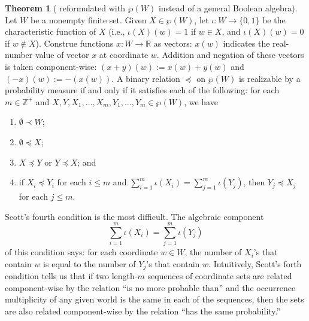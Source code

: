 \documentclass[12pt]{article}
\theoremstyle{definition}
\newtheorem{theorem}{Theorem}[section]
\begin{document}
\begin{theorem}[{\cite[Theorem 4.1]{Sco64:JMP}} reformulated with
  $\wp(W)$ instead of a general Boolean algebra]
  Let $W$ be a nonempty finite set. Given $X\in\wp(W)$, let
  $\iota:W\to\{0,1\}$ be the characteristic function of $X$ (i.e.,
  $\iota(X)(w)=1$ if $w\in X$, and $\iota(X)(w)=0$ if $w\notin X$).
  Construe functions $x:W\to\mathbb{R}$ as vectors: $x(w)$ indicates
  the real-number value of vector $x$ at coordinate $w$. Addition and
  negation of these vectors is taken component-wise:
  $(x+y)(w):=x(w)+y(w)$ and $(-x)(w):=-(x(w))$.  A binary relation
  $\preceq$ on $\wp(W)$ is realizable by a probability measure if and
  only if it satisfies each of the following: for each
  $m\in\mathbb{Z}^+$ and $X,Y,X_1,\dots,X_m,Y_1,\dots,Y_m\in\wp(W)$,
  we have
  \begin{enumerate}
  \item $\emptyset\prec W$;

  \item $\emptyset\preceq X$;

  \item $X\preceq Y$ or $Y\preceq X$; and

  \item if $X_i\preceq Y_i$ for each $i\leq m$ and
    $\sum_{i=1}^m \iota(X_i)=\sum_{j=1}^m\iota(Y_j)$, then
    $Y_j\preceq X_j$ for each $j\leq m$.
  \end{enumerate}
\end{theorem}

Scott's fourth condition is the most difficult. The algebraic
component
\begin{equation}
  \textstyle
  \sum_{i=1}^m \iota(X_i)=\sum_{j=1}^m\iota(Y_j)
  \label{eq:Scott4th}
\end{equation}
of this condition says: for each coordinate $w\in W$, the number of
$X_i$'s that contain $w$ is equal to the number of $Y_j$'s that
contain $w$.  Intuitively, Scott's forth condition tells us that if
two length-$m$ sequences of coordinate sets are related component-wise
by the relation ``is no more probable than'' and the occurrence
multiplicity of any given world is the same in each of the sequences,
then the sets are also related component-wise by the relation ``has
the same probability.''
\end{document}
